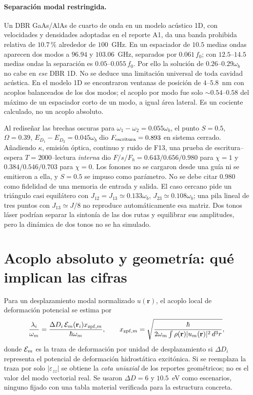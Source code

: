 \documentclass[11pt,a4paper]{article}
\newcommand{\wb}{\omega_b}
\begin{document}
\paragraph{Separación modal restringida.} Un DBR GaAs/AlAs de cuarto de onda
en un modelo acústico 1D, con velocidades y densidades adoptadas en el reporte
A1, da una banda prohibida relativa de $10.7$\,\% alrededor de $100$~GHz.
En un espaciador de $10.5$ medias ondas aparecen dos modos a
$96.94$ y $103.06$~GHz, separados por $0.061\,f_0$; con
$12.5$--$14.5$ medias ondas la separación es $0.05$--$0.055\,f_0$.
Por ello la solución de $0.26$--$0.29\wb$ no cabe en \emph{ese} DBR 1D.
No se deduce una limitación universal de toda cavidad acústica.
En el modelo 1D se encontraron ventanas de posición de $4$--$5.8$~nm
con acoplos balanceados de los dos modos; el acoplo por modo fue solo
$\sim0.54$--$0.58$ del máximo de un espaciador corto de un modo, a
igual área lateral. Es un cociente calculado, no un acoplo absoluto.

Al rediseñar las brechas oscuras para $\omega_1-\omega_2=0.055\wb$,
el punto $S=0.5$, $\Omega=0.39$, $E_{D_1}-E_{D_2}=0.045\wb$
dio $F_{\rm escritura}=0.893$ en sistema cerrado. Añadiendo
$\kappa$, emisión óptica, continuo y ruido de F13, una prueba de
escritura--espera $T=2000$--lectura \emph{interna} dio
$F/s/F_h=0.643/0.656/0.980$ para $\chi=1$ y
$0.384/0.546/0.703$ para $\chi=0$. Los fonones no se cargaron desde
una guía ni se emitieron a ella, y $S=0.5$ se impuso como parámetro.
No se debe citar $0.980$ como fidelidad de una memoria de entrada y salida.
El caso cercano pide un triángulo casi equilátero con
$J_{12}=J_{13}\simeq0.133\wb$, $J_{23}\simeq0.108\wb$;
una pila lineal de tres puntos con $J_{13}\simeq J/8$ no reproduce
automáticamente esa matriz. Dos tonos láser podrían separar la sintonía
de las dos rutas y equilibrar sus amplitudes, pero la dinámica de dos tonos
no se ha simulado.

\section{Acoplo absoluto y geometría: qué implican las cifras}\label{sec:geom}
Para un desplazamiento modal normalizado $u(\mathbf r)$, el acoplo local
de deformación potencial se estima por
\begin{equation}
\frac{\lambda_i}{\omega_m}=
\frac{\Delta D_i\,{\cal E}_m(\mathbf r_i)x_{{\rm zpf},m}}{\hbar\omega_m},
\qquad x_{{\rm zpf},m}=
\sqrt{\frac{\hbar}{2\omega_m\int\rho(\mathbf r)|u_m(\mathbf r)|^2\,d^3r}},
\label{eq:lambdageom}
\end{equation}
donde ${\cal E}_m$ es la traza de deformación por unidad de desplazamiento
si $\Delta D_i$ representa el potencial de deformación hidrostática
excitónica. Si se reemplaza la traza por solo $|\varepsilon_{zz}|$ se
obtiene la \emph{cota uniaxial} de los reportes geométricos; no es el valor
del modo vectorial real. Se usaron $\Delta D=6$ y $10.5$~eV como
escenarios, ninguno fijado con una tabla material verificada para la
estructura concreta.
\end{document}
